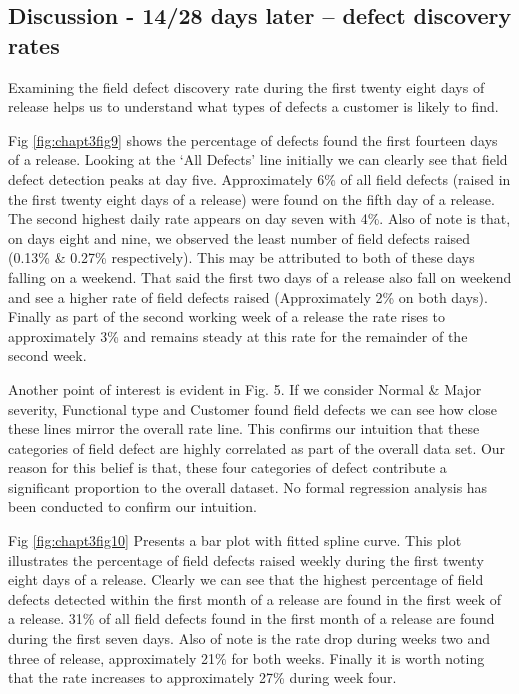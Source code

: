 \subsection{Discussion - 14/28 days later -- defect discovery rates}

Examining the field defect discovery rate during the first twenty eight days of release helps us to understand what types of defects a customer is likely to find. \par 

Fig \ref{fig:chapt3fig9} shows the percentage of defects found the first fourteen days of a release. Looking at the
`All Defects' line initially we can clearly see that field defect detection peaks at day five. Approximately 6\% of all field
defects (raised in the first twenty eight days of a release) were found on the fifth day of a release. The second highest
daily rate appears on day seven with 4\%. Also of note is that, on days eight and nine, we observed the least number
of field defects raised (0.13\% \& 0.27\% respectively). This may be attributed to both of these days falling on a weekend. That said the first two days of a release also fall on weekend and see a higher rate of field defects raised (Approximately 2\% on both days). Finally as part of the second working week of a release the rate rises to approximately 3\% and remains steady at this rate for the remainder of the second week. \par 

Another point of interest is evident in Fig. 5. If we consider Normal \& Major severity, Functional type and Customer
found field defects we can see how close these lines mirror the overall rate line. This confirms our intuition that these
categories of field defect are highly correlated as part of the overall data set. Our reason for this belief is that, these four categories of defect contribute a significant proportion to the overall dataset. No formal regression analysis has been conducted to confirm our intuition. \par 

Fig \ref{fig:chapt3fig10} Presents a bar plot with fitted spline curve. This plot illustrates the percentage of field defects raised weekly during the first twenty eight days of a release. Clearly we can see that the highest percentage of field defects detected within the first month of a release are found in the first week of a release. 31\% of all field defects found in the first month of a release are found during the first seven days. Also of note is the rate drop during weeks two and three of release, approximately 21\% for both weeks. Finally it is worth noting that the rate increases to approximately 27\% during week four. \par 

